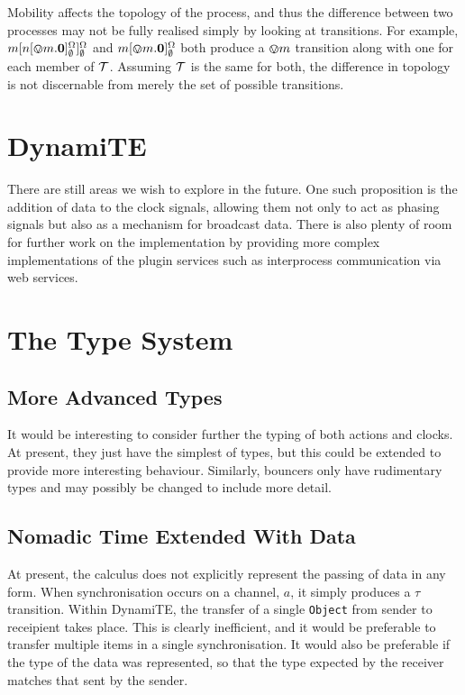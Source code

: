 Mobility affects the topology of the process, and thus the difference
between two processes may not be fully realised simply by looking at
transitions.  For example,
${m}[ {n}[ \varovee m.\textbf{0} ]^{\Omega}_{\emptyset} ]^{\Omega}_{\emptyset}$
and ${m}[ \varovee m.\textbf{0} ]^{\Omega}_{\emptyset}$ both produce a
$\varovee m$ transition along with one for each member of $\text{$\mathcal{T}$}$.
Assuming $\text{$\mathcal{T}$}$ is the same for both, the difference in topology is
not discernable from merely the set of possible transitions.

\section{DynamiTE}
\label{future:dynamite}

There are still areas we wish to explore in the future.  One such
proposition is the addition of data to the clock signals, allowing
them not only to act as phasing signals but also as a mechanism for
broadcast data.  There is also plenty of room for further work on the
implementation by providing more complex implementations of the plugin
services such as interprocess communication via web services.

\section{The Type System}
\label{future:types}

\subsection{More Advanced Types}

It would be interesting to consider further the typing of both actions
and clocks.  At present, they just have the simplest of types, but
this could be extended to provide more interesting behaviour.
Similarly, bouncers only have rudimentary types and may possibly be
changed to include more detail.

\subsection{Nomadic Time Extended With Data}
\label{tnted}

At present, the calculus does not explicitly represent the passing of
data in any form.  When synchronisation occurs on a channel, $a$, it
simply produces a $\tau$ transition.  Within DynamiTE, the transfer of
a single \texttt{Object} from sender to receipient takes place.  This
is clearly inefficient, and it would be preferable to transfer
multiple items in a single synchronisation.  It would also be
preferable if the type of the data was represented, so that the type
expected by the receiver matches that sent by the sender.

